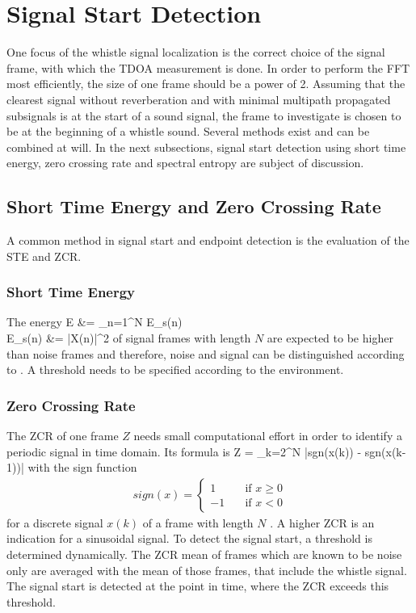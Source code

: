 \section{Signal Start Detection}
\label{sec:02_signalStartDetection}

One focus of the whistle signal localization is the correct choice of the
signal frame, with which the \ac{TDOA} measurement is done.
In order to perform the \ac{FFT} most efficiently, the size of one frame
should be a power of 2.
Assuming that the clearest signal without reverberation and with minimal
multipath propagated subsignals is at the start of a sound signal,
the frame to investigate is chosen to be at the beginning of a whistle sound.
Several methods exist and can be combined at will.
In the next subsections, signal start detection using short time energy,
zero crossing rate and spectral entropy are subject of discussion.

\subsection{Short Time Energy and Zero Crossing Rate}

A common method in signal start and endpoint detection is the evaluation
of the \ac{STE} and \ac{ZCR}.

\subsubsection{Short Time Energy}
The energy
\bal
    E &= \sum_{n=1}^N E_s(n)\\
    \label{eq:02_energy}
    E_s(n) &= |X(n)|^2
    \label{eq:02_spectralEnergy}
\eal
of signal frames with length $N$ are expected to be higher than noise frames
and therefore, noise and signal can be distinguished
according to \cite{Z_W_voiceActivity}.
A threshold needs to be specified according to the environment.

\subsubsection{Zero Crossing Rate}

The \ac{ZCR} of one frame $Z$ needs small computational effort in order to
identify a periodic signal in time domain.
Its formula is
\bal
    Z = \sum_{k=2}^N |sgn(x(k)) - sgn(x(k-1))|
    \label{eq:02_zcr}
\eal
with the sign function
\begin{align*}
    sign(x) =
    \begin{cases}
        1 & \quad \text{if } x\geq 0 \\
        -1 & \quad \text{if } x < 0
    \end{cases}
\end{align*}
for a discrete signal $x(k)$ of a frame with length $N$ \cite{Z_W_voiceActivity}.
A higher \ac{ZCR} is an indication for a sinusoidal signal.
To detect the signal start, a threshold is determined dynamically.
The \ac{ZCR} mean of frames which are known to be noise only
are averaged with the mean of those frames, that include the whistle signal.
The signal start is detected at the point in time, where the \ac{ZCR} exceeds
this threshold.

